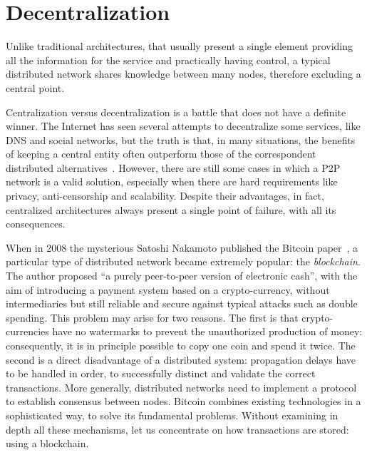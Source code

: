 \section{Decentralization}
\label{sec:decentralization}

Unlike traditional architectures, that usually present a single element providing all the information for the service and practically having control, a typical distributed network shares knowledge between many nodes, therefore excluding a central point.

Centralization versus decentralization is a battle that does not have a definite winner. The Internet has seen several attempts to decentralize some services, like DNS and social networks, but the truth is that, in many situations, the benefits of keeping a central entity often outperform those of the correspondent distributed alternatives~\cite{Montresor_Permissionless}. However, there are still some cases in which a P2P network is a valid solution, especially when there are hard requirements like privacy, anti-censorship and scalability. Despite their advantages, in fact, centralized architectures always present a single point of failure, with all its consequences.

When in 2008 the mysterious Satoshi Nakamoto published the Bitcoin paper~\cite{bitcoin}, a particular type of distributed network became extremely popular: the \emph{blockchain}. The author proposed ``a purely peer-to-peer version of electronic cash'', with the aim of introducing a payment system based on a crypto-currency, without intermediaries but still reliable and secure against typical attacks such as double spending. This problem may arise for two reasons. The first is that crypto-currencies have no watermarks to prevent the unauthorized production of money: consequently, it is in principle possible to copy one coin and spend it twice. The second is a direct disadvantage of a distributed system: propagation delays have to be handled in order, to successfully distinct and validate the correct transactions. More generally, distributed networks need to implement a protocol to establish consensus between nodes.
Bitcoin combines existing technologies in a sophisticated way, to solve its fundamental problems. Without examining in depth all these mechanisms, let us concentrate on how transactions are stored: using a blockchain.

